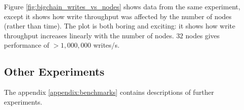 Figure \ref{fig:bigchain_writes_vs_nodes} shows data from the same experiment, except it shows how write throughput was affected by the number of nodes (rather than time).
The plot is both boring and exciting: it shows how write throughput increases linearly with the number of nodes.
$32$ nodes gives performance of $>1,000,000$ writes/s.

\subsection{Other Experiments}
The appendix \ref{appendix:benchmarks} contains descriptions of further experiments.